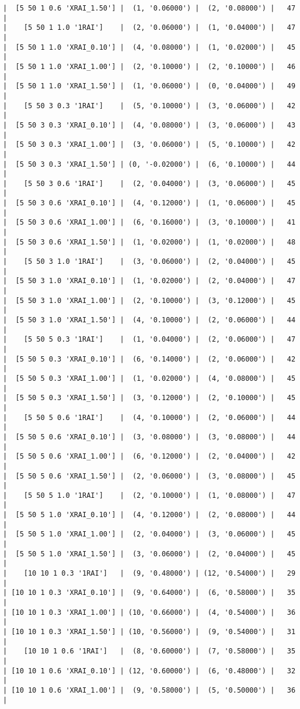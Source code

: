 \documentclass{article}
\begin{document}
\begin{verbatim}
|  [5 50 1 0.6 'XRAI_1.50'] |  (1, '0.06000') |  (2, '0.08000') |   47  |
|    [5 50 1 1.0 '1RAI']    |  (2, '0.06000') |  (1, '0.04000') |   47  |
|  [5 50 1 1.0 'XRAI_0.10'] |  (4, '0.08000') |  (1, '0.02000') |   45  |
|  [5 50 1 1.0 'XRAI_1.00'] |  (2, '0.10000') |  (2, '0.10000') |   46  |
|  [5 50 1 1.0 'XRAI_1.50'] |  (1, '0.06000') |  (0, '0.04000') |   49  |
|    [5 50 3 0.3 '1RAI']    |  (5, '0.10000') |  (3, '0.06000') |   42  |
|  [5 50 3 0.3 'XRAI_0.10'] |  (4, '0.08000') |  (3, '0.06000') |   43  |
|  [5 50 3 0.3 'XRAI_1.00'] |  (3, '0.06000') |  (5, '0.10000') |   42  |
|  [5 50 3 0.3 'XRAI_1.50'] | (0, '-0.02000') |  (6, '0.10000') |   44  |
|    [5 50 3 0.6 '1RAI']    |  (2, '0.04000') |  (3, '0.06000') |   45  |
|  [5 50 3 0.6 'XRAI_0.10'] |  (4, '0.12000') |  (1, '0.06000') |   45  |
|  [5 50 3 0.6 'XRAI_1.00'] |  (6, '0.16000') |  (3, '0.10000') |   41  |
|  [5 50 3 0.6 'XRAI_1.50'] |  (1, '0.02000') |  (1, '0.02000') |   48  |
|    [5 50 3 1.0 '1RAI']    |  (3, '0.06000') |  (2, '0.04000') |   45  |
|  [5 50 3 1.0 'XRAI_0.10'] |  (1, '0.02000') |  (2, '0.04000') |   47  |
|  [5 50 3 1.0 'XRAI_1.00'] |  (2, '0.10000') |  (3, '0.12000') |   45  |
|  [5 50 3 1.0 'XRAI_1.50'] |  (4, '0.10000') |  (2, '0.06000') |   44  |
|    [5 50 5 0.3 '1RAI']    |  (1, '0.04000') |  (2, '0.06000') |   47  |
|  [5 50 5 0.3 'XRAI_0.10'] |  (6, '0.14000') |  (2, '0.06000') |   42  |
|  [5 50 5 0.3 'XRAI_1.00'] |  (1, '0.02000') |  (4, '0.08000') |   45  |
|  [5 50 5 0.3 'XRAI_1.50'] |  (3, '0.12000') |  (2, '0.10000') |   45  |
|    [5 50 5 0.6 '1RAI']    |  (4, '0.10000') |  (2, '0.06000') |   44  |
|  [5 50 5 0.6 'XRAI_0.10'] |  (3, '0.08000') |  (3, '0.08000') |   44  |
|  [5 50 5 0.6 'XRAI_1.00'] |  (6, '0.12000') |  (2, '0.04000') |   42  |
|  [5 50 5 0.6 'XRAI_1.50'] |  (2, '0.06000') |  (3, '0.08000') |   45  |
|    [5 50 5 1.0 '1RAI']    |  (2, '0.10000') |  (1, '0.08000') |   47  |
|  [5 50 5 1.0 'XRAI_0.10'] |  (4, '0.12000') |  (2, '0.08000') |   44  |
|  [5 50 5 1.0 'XRAI_1.00'] |  (2, '0.04000') |  (3, '0.06000') |   45  |
|  [5 50 5 1.0 'XRAI_1.50'] |  (3, '0.06000') |  (2, '0.04000') |   45  |
|    [10 10 1 0.3 '1RAI']   |  (9, '0.48000') | (12, '0.54000') |   29  |
| [10 10 1 0.3 'XRAI_0.10'] |  (9, '0.64000') |  (6, '0.58000') |   35  |
| [10 10 1 0.3 'XRAI_1.00'] | (10, '0.66000') |  (4, '0.54000') |   36  |
| [10 10 1 0.3 'XRAI_1.50'] | (10, '0.56000') |  (9, '0.54000') |   31  |
|    [10 10 1 0.6 '1RAI']   |  (8, '0.60000') |  (7, '0.58000') |   35  |
| [10 10 1 0.6 'XRAI_0.10'] | (12, '0.60000') |  (6, '0.48000') |   32  |
| [10 10 1 0.6 'XRAI_1.00'] |  (9, '0.58000') |  (5, '0.50000') |   36  |

\end{verbatim}
\end{document}
